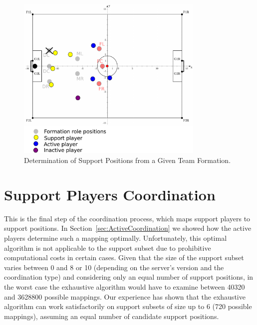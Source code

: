 \begin{figure}[t!]
\centering
  \includegraphics[width=0.8\textwidth]{Chapter4/figures/SupportPos.pdf}
  \caption{Determination of Support Positions from a Given Team Formation.} 
  \label{fig:SupportPos}
\end{figure}

\section{Support Players Coordination}
This is the final step of the coordination process, which maps support players to support positions. In Section~\ref{sec:ActiveCoordination} we showed how the active players determine such a mapping optimally. Unfortunately, this optimal algorithm is not applicable to the support subset due to prohibitive computational costs in certain cases. Given that the size of the support subset varies between 0 and 8 or 10 (depending on the server's version and the coordination type) and considering only an equal number of support positions, in the worst case the exhaustive algorithm would have to examine between 40320 and 3628800 possible mappings. Our experience has shown that the exhaustive algorithm can work satisfactorily on support subsets of size up to 6 (720 possible mappings), assuming an equal number of candidate support positions.  

